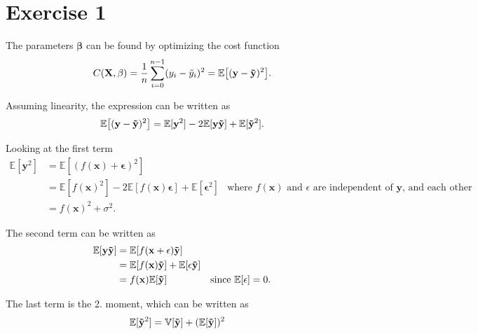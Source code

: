 \section{Exercise 1}\label{sec:ex1}
The parameters $\mathbf{\beta}$ can be found by optimizing the cost function
\begin{equation*}
    C(\mathbf{X}, \mathbf{\beta}) = \frac{1}{n} \sum_{i=0}^{n-1} ( y_{i} - \Tilde{y}_{i} )^{2} = \mathbb{E} \big[ ( \mathbf{y} - \mathbf{\Tilde{y}} )^{2} \big] .
\end{equation*}

Assuming linearity, the expression can be written as 
\begin{equation*}
    \mathbb{E} \big[ ( \mathbf{y} - \mathbf{\Tilde{y}} )^{2} \big] = \mathbb{E} [ \mathbf{y}^{2} ] - 2 \mathbb{E} [ \mathbf{y} \mathbf{\Tilde{y}} ] + \mathbb{E} [ \mathbf{\Tilde{y}}^{2} ].
\end{equation*}

Looking at the first term
\begin{align*}
    \mathbb{E} [ \mathbf{y}^{2} ] &= \mathbb{E} [ ( f(\mathbf{x}) + \mathbf{\epsilon} )^{2} ] \\
    &= \mathbb{E} [ f(\mathbf{x})^{2} ] - 2 \mathbb{E} [ f(\mathbf{x}) \mathbf{\epsilon} ] + \mathbb{E} [ \mathbf{\epsilon}^{2} ] & \text{where $f(\mathbf{x})$ and $\epsilon$ are independent of $\mathbf{y}$, and each other} \\
    &= f(\mathbf{x})^{2} + \sigma^{2} .
\end{align*}

The second term can be written as 
\begin{align*}
    \mathbb{E} [ \mathbf{y} \mathbf{\Tilde{y}} ] &= \mathbb{E} [ f(\mathbf{x} + \mathbf{\epsilon}) \mathbf{\Tilde{y}} ] \\
    &= \mathbb{E} [ f(\mathbf{x}) \mathbf{\Tilde{y}} ] + \mathbb{E} [ \epsilon \mathbf{\Tilde{y}} ] \\
    &=  f(\mathbf{x}) \mathbb{E} [ \mathbf{\Tilde{y}} ] & \text{since $\mathbb{E}[\mathbf{\epsilon}] = 0$} .
\end{align*}

The last term is the 2. moment, which can be written as 
\begin{align*}
    \mathbb{E} [ \mathbf{\Tilde{y}}^{2} ] &= \mathbb{V}[\mathbf{\Tilde{y}}] + (\mathbb{E} [ \mathbf{\Tilde{y}} ])^{2} 
\end{align*}

